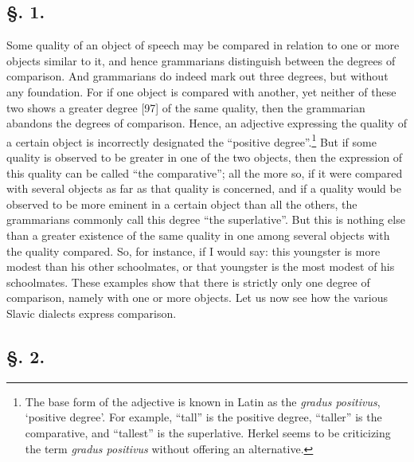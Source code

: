 \subsection*{\hspace*{\fill}§. 1.\hspace*{\fill}}

Some quality of an object of speech may be compared in relation to one or more objects similar to it, and hence grammarians distinguish between the degrees of comparison. And grammarians do indeed mark out three degrees, but without any foundation. For if one object is compared with another, yet neither of these two shows a greater degree [97] of the same quality, then the grammarian abandons the degrees of comparison. Hence, an adjective expressing the quality of a certain object is incorrectly designated the “positive degree”.\footnote{The base form of the adjective is known in Latin as the \textit{gradus positivus}, ‘positive degree’. For example, “tall” is the positive degree, “taller” is the comparative, and “tallest” is the superlative. Herkel seems to be criticizing the term \textit{gradus positivus} without offering an alternative.} But if some quality is observed to be greater in one of the two objects, then the expression of this quality can be called “the comparative”; all the more so, if it were compared with several objects as far as that quality is concerned, and if a quality would be observed to be more eminent in a certain object than all the others, the grammarians commonly call this degree “the superlative”. But this is nothing else than a greater existence of the same quality in one among several objects with the quality compared. So, for instance, if I would say: this youngster is more modest than his other schoolmates, or that youngster is the most modest of his schoolmates. These examples show that there is strictly only one degree of comparison, namely with one or more objects. Let us now see how the various Slavic dialects express comparison.

\subsection*{\hspace*{\fill}§. 2.\hspace*{\fill}}

